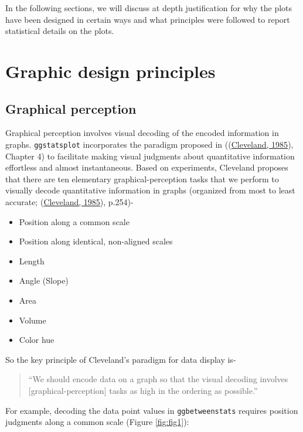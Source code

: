 \documentclass[
]{article}
\providecommand{\tightlist}{%
  \setlength{\itemsep}{0pt}\setlength{\parskip}{0pt}}
\begin{document}
In the following sections, we will discuss at depth justification for why the
plots have been designed in certain ways and what principles were followed to
report statistical details on the plots.

\hypertarget{graphic-design-principles}{%
\section{Graphic design principles}\label{graphic-design-principles}}

\hypertarget{graphical-perception}{%
\subsection{Graphical perception}\label{graphical-perception}}

Graphical perception involves visual decoding of the encoded information in
graphs. \texttt{ggstatsplot} incorporates the paradigm proposed in
((\protect\hyperlink{ref-clevelandElementsGraphingData1985}{Cleveland, 1985}), Chapter 4) to facilitate making visual
judgments about quantitative information effortless and almost instantaneous.
Based on experiments, Cleveland proposes that there are ten elementary
graphical-perception tasks that we perform to visually decode quantitative
information in graphs (organized from most to least accurate;
(\protect\hyperlink{ref-clevelandElementsGraphingData1985}{Cleveland, 1985}), p.254)-

\begin{itemize}
\tightlist
\item
  Position along a common scale
\item
  Position along identical, non-aligned scales
\item
  Length
\item
  Angle (Slope)
\item
  Area
\item
  Volume
\item
  Color hue
\end{itemize}

So the key principle of Cleveland's paradigm for data display is-

\begin{quote}
``We should encode data on a graph so that the visual decoding involves
{[}graphical-perception{]} tasks as high in the ordering as possible.''
\end{quote}

For example, decoding the data point values in \texttt{ggbetweenstats} requires
position judgments along a common scale (Figure \ref{fig:fig1}):
\end{document}
